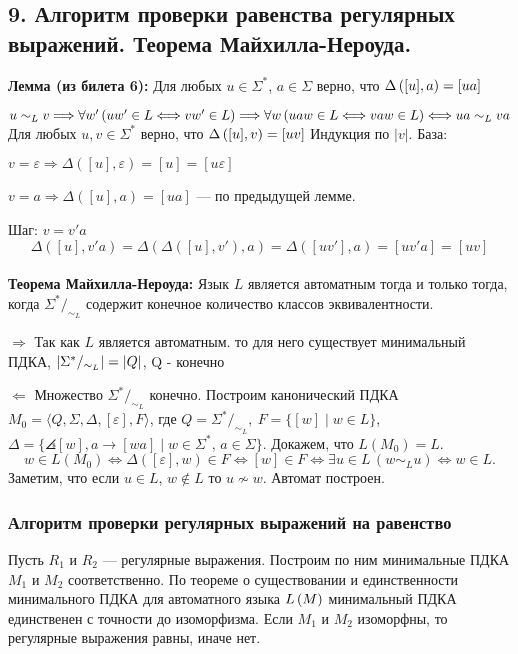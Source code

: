 \subsection{9. Алгоритм проверки равенства регулярных выражений. Теорема Майхилла-Нероуда.}
\textbf{Лемма (из билета 6):} Для любых $u \in \Sigma^*$, $a \in \Sigma$ верно, что $\Delta \left({[u], a}\right) = [ua]$

\Proof
 $u \sim_L v \Longrightarrow \forall w' \left({uw' \in L \Longleftrightarrow vw' \in L}\right) \Longrightarrow \forall w \left({uaw \in L \Longleftrightarrow vaw \in L}\right) \Longleftrightarrow ua \sim_L va$ \EndProof
\\

\Lemma Для любых $u, v \in \Sigma^*$ верно, что $\Delta \left({[u], v}\right) = [uv]$
\newline \Proof
Индукция по $|v|$. База:

$v = \varepsilon \Longrightarrow \Delta([u], \varepsilon) = [u] = [u\varepsilon]$

$v = a \Longrightarrow \Delta([u], a) = [ua]$ — по предыдущей лемме.

Шаг: $v = v'a$
$$\Delta([u], v'a) = \Delta(\Delta([u], v'), a) = \Delta([uv'], a) = [uv'a] = [uv]$$
\EndProof\\ 


\textbf{Теорема Майхилла-Нероуда:} Язык $L$ является автоматным тогда и только тогда, когда $\Sigma^* /_{\sim_L}$ содержит конечное количество классов эквивалентности.

\Proof

$\Longrightarrow$ Так как $L$ является автоматным. то для него существует минимальный ПДКА, $\arrowvert \Sigma^* /_{\sim_L} \arrowvert = \arrowvert Q \arrowvert$, Q - конечно

$\Longleftarrow$ Множество $\Sigma^* /_{\sim_L}$ конечно. Построим канонический ПДКА $M_0 = \langle Q, \Sigma, \Delta, [\varepsilon], F \rangle$, где $Q=\Sigma^* /_{\sim_L}, \ F = \{ [w] \;|\; w \in L \}$, $\Delta = \{\angles{[w], a} \rightarrow [wa] \;|\; w\in\Sigma^*, \, a\in\Sigma\}$. Докажем, что $L(M_0) = L$.
$$
w\in L(M_0) \Longleftrightarrow \Delta([\varepsilon],w)\in F \Longleftrightarrow [w] \in F \Longleftrightarrow \exists u \in L \, (w \sim_L u) \Longleftrightarrow w\in L.
$$
Заметим, что если $u \in L$, $w\notin L$ то $u \nsim w$. Автомат построен. \EndProof

\subsubsection*{Алгоритм проверки регулярных выражений на равенство}

Пусть $R_1$ и $R_2$ — регулярные выражения. Построим по ним минимальные ПДКА $M_1$ и $M_2$ соответственно. По теореме о существовании и единственности минимального ПДКА для автоматного языка $L \left({M}\right)$ минимальный ПДКА единственен с точности до изоморфизма. Если $M_1$ и $M_2$ изоморфны, то регулярные выражения равны, иначе нет.
